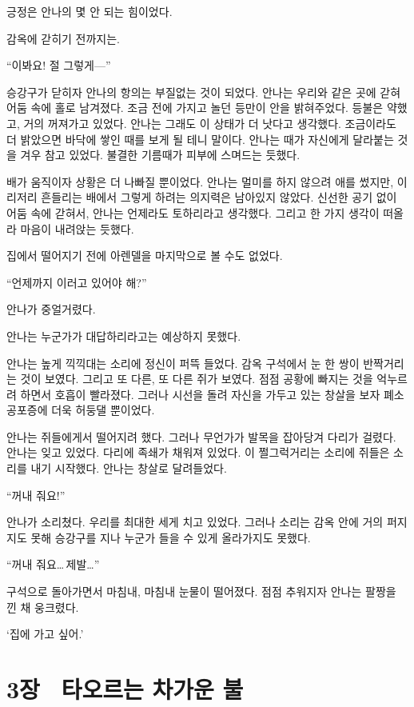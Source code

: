 긍정은 안나의 몇 안 되는 힘이었다.

감옥에 갇히기 전까지는.

``이봐요! 절 그렇게—''

승강구가 닫히자 안나의 항의는 부질없는 것이 되었다. 안나는 우리와 같은 곳에 갇혀 어둠 속에 홀로 남겨졌다. 조금 전에 가지고 놀던 등만이 안을 밝혀주었다. 등불은 약했고, 거의 꺼져가고 있었다. 안나는 그래도 이 상태가 더 낫다고 생각했다. 조금이라도 더 밝았으면 바닥에 쌓인 때를 보게 될 테니 말이다. 안나는 때가 자신에게 달라붙는 것을 겨우 참고 있었다. 불결한 기름때가 피부에 스며드는 듯했다.

배가 움직이자 상황은 더 나빠질 뿐이었다. 안나는 멀미를 하지 않으려 애를 썼지만, 이리저리 흔들리는 배에서 그렇게 하려는 의지력은 남아있지 않았다. 신선한 공기 없이 어둠 속에 갇혀서, 안나는 언제라도 토하리라고 생각했다. 그리고 한 가지 생각이 떠올라 마음이 내려앉는 듯했다.

집에서 떨어지기 전에 아렌델을 마지막으로 볼 수도 없었다.

``언제까지 이러고 있어야 해?''

안나가 중얼거렸다.

안나는 누군가가 대답하리라고는 예상하지 못했다.

안나는 높게 끽끽대는 소리에 정신이 퍼뜩 들었다. 감옥 구석에서 눈 한 쌍이 반짝거리는 것이 보였다. 그리고 또 다른, 또 다른 쥐가 보였다. 점점 공황에 빠지는 것을 억누르려 하면서 호흡이 빨라졌다. 그러나 시선을 돌려 자신을 가두고 있는 창살을 보자 폐소공포증에 더욱 허둥댈 뿐이었다.

안나는 쥐들에게서 떨어지려 했다. 그러나 무언가가 발목을 잡아당겨 다리가 걸렸다. 안나는 잊고 있었다. 다리에 족쇄가 채워져 있었다. 이 쩔그럭거리는 소리에 쥐들은 소리를 내기 시작했다. 안나는 창살로 달려들었다.

``꺼내 줘요!''

안나가 소리쳤다. 우리를 최대한 세게 치고 있었다. 그러나 소리는 감옥 안에 거의 퍼지지도 못해 승강구를 지나 누군가 들을 수 있게 올라가지도 못했다.

``꺼내 줘요\ldots\,제발\ldots''

구석으로 돌아가면서 마침내, 마침내 눈물이 떨어졌다. 점점 추워지자 안나는 팔짱을 낀 채 웅크렸다.

`집에 가고 싶어.'



\chapter[3장  타오르는 차가운 불][{3장\hspace*{.5em}타오르는 차가운 불}]{3장 \ 타오르는 차가운 불}



